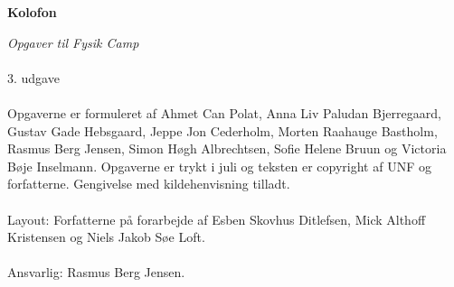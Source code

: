 \begin{center}
\textbf{Kolofon}
\end{center}
\textit{Opgaver til Fysik Camp \campyear}\\\\
3. udgave\\\\
Opgaverne er formuleret af Ahmet Can Polat, Anna Liv Paludan Bjerregaard, Gustav Gade Hebsgaard, Jeppe Jon Cederholm, Morten Raahauge Bastholm, Rasmus Berg Jensen, Simon Høgh Albrechtsen, Sofie Helene Bruun og Victoria Bøje Inselmann. Opgaverne er trykt i juli {\campyear} og teksten er copyright {\textcopyright} {\campyear} af UNF og forfatterne. Gengivelse med kildehenvisning tilladt. \\\\
  Layout: Forfatterne på forarbejde af Esben Skovhus Ditlefsen, Mick Althoff Kristensen og Niels Jakob Søe Loft.\\\\
  Ansvarlig: Rasmus Berg Jensen.